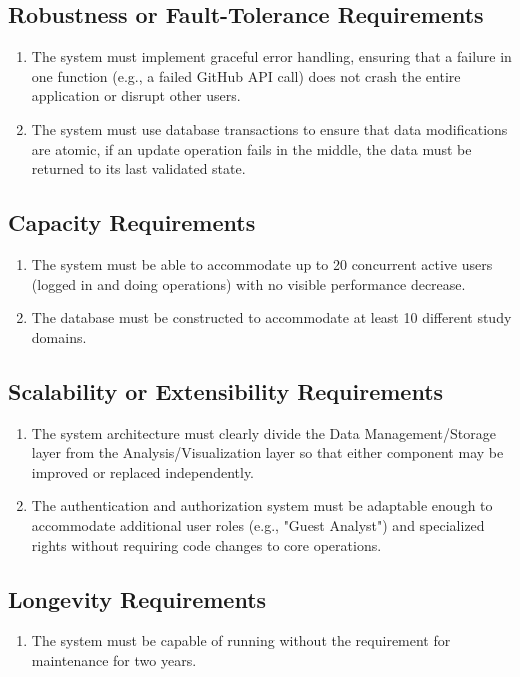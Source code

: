 \documentclass[12pt]{article}
\begin{document}
\subsection{Robustness or Fault-Tolerance Requirements}
\begin{enumerate}[label=\thesubsection-\arabic*]
  \item The system must implement graceful error handling, ensuring that a failure in one function (e.g., a failed GitHub API call) does not crash the entire application or disrupt other users.
  \item The system must use database transactions to ensure that data modifications are atomic, if an update operation fails in the middle, the data must be returned to its last validated state.
\end{enumerate}
\subsection{Capacity Requirements}
\begin{enumerate}[label=\thesubsection-\arabic*]
  \item The system must be able to accommodate up to 20 concurrent active users (logged in and doing operations) with no visible performance decrease.
  \item The database must be constructed to accommodate at least 10 different study domains.
\end{enumerate}
\subsection{Scalability or Extensibility Requirements}
\begin{enumerate}[label=\thesubsection-\arabic*]
  \item The system architecture must clearly divide the Data Management/Storage layer from the Analysis/Visualization layer so that either component may be improved or replaced independently.
  \item The authentication and authorization system must be adaptable enough to accommodate additional user roles (e.g., "Guest Analyst") and specialized rights without requiring code changes to core operations.
\end{enumerate}
\subsection{Longevity Requirements}
\begin{enumerate}[label=\thesubsection-\arabic*]
  \item The system must be capable of running without the requirement for maintenance for two years. 
\end{enumerate}
\end{document}
